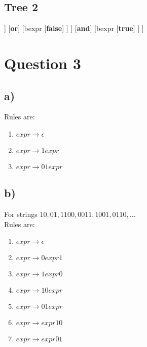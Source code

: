 \documentclass[12pt, A4]{article}
\begin{document}
	\subsection*{Tree 2}
	\begin{forest}
		[bexpr
			[bexpr
				[bexpr
					[\textbf{true}]
				]
				[\textbf{or}]
				[bexpr
					[\textbf{false}]
				]
			]
			[\textbf{and}]
			[bexpr
				[\textbf{true}]
			]
		]
	\end{forest}
	
	\newpage
	\section{Question 3}
	
	\subsection*{a)}
	
	Rules are: \\
	\begin{enumerate}
		\item $expr \rightarrow \epsilon$
		\item $expr \rightarrow 1expr$
		\item $expr \rightarrow 01expr$
	\end{enumerate}
	
	\subsection*{b)}
	
	For strings $10, 01, 1100, 0011, 1001, 0110, ...$\\
	Rules are: \\
	\begin{enumerate}
		\item $expr \rightarrow \epsilon$
		\item $expr \rightarrow 0expr1$
		\item $expr \rightarrow 1expr0$
		\item $expr \rightarrow 10expr$
		\item $expr \rightarrow 01expr$
		\item $expr \rightarrow expr10$
		\item $expr \rightarrow expr01$
	\end{enumerate}
	
\end{document}
